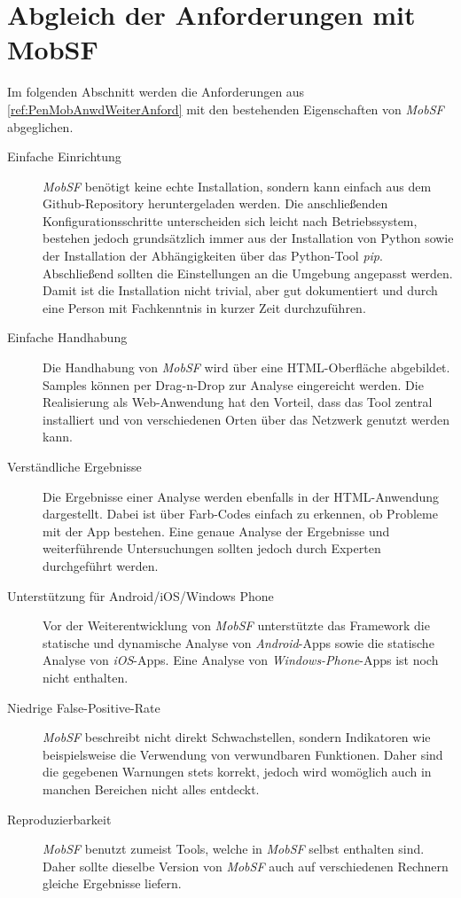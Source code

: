 

\newpage
\section{Abgleich der Anforderungen mit MobSF}\label{ref:PenMobAnwAbgAndMobSF}

Im folgenden Abschnitt werden die Anforderungen aus \ref{ref:PenMobAnwdWeiterAnford} mit den bestehenden Eigenschaften von \textit{MobSF} abgeglichen.

\begin{description}
	\item[Einfache Einrichtung] \textit{MobSF} benötigt keine echte Installation, sondern kann einfach aus dem Github-Repository heruntergeladen werden. Die anschließenden Konfigurationsschritte unterscheiden sich leicht nach Betriebssystem, bestehen jedoch grundsätzlich immer aus der Installation von Python sowie der Installation der Abhängigkeiten über das Python-Tool \textit{pip}. Abschließend sollten die Einstellungen an die Umgebung angepasst werden. Damit ist die Installation nicht trivial, aber gut dokumentiert und durch eine Person mit Fachkenntnis in kurzer Zeit durchzuführen.
	
	\item[Einfache Handhabung] Die Handhabung von \textit{MobSF} wird über eine HTML-Oberfläche abgebildet. Samples können per Drag-n-Drop zur Analyse eingereicht werden. Die Realisierung als Web-Anwendung hat den Vorteil, dass das Tool zentral installiert und von verschiedenen Orten über das Netzwerk genutzt werden kann.
	
	\item[Verständliche Ergebnisse] Die Ergebnisse einer Analyse werden ebenfalls in der HTML-Anwendung dargestellt. Dabei ist über Farb-Codes einfach zu erkennen, ob Probleme mit der App bestehen. Eine genaue Analyse der Ergebnisse und weiterführende Untersuchungen sollten jedoch durch Experten durchgeführt werden.
	
	\item[Unterstützung für Android/iOS/Windows Phone] Vor der Weiterentwicklung von \textit{MobSF} unterstützte das Framework die statische und dynamische Analyse von \textit{Android}-Apps sowie die statische Analyse von \textit{iOS}-Apps. Eine Analyse von \textit{Windows-Phone}-Apps ist noch nicht enthalten.
	
	\item[Niedrige False-Positive-Rate] \textit{MobSF} beschreibt nicht direkt Schwachstellen, sondern Indikatoren wie beispielsweise die Verwendung von verwundbaren Funktionen. Daher sind die gegebenen Warnungen stets korrekt, jedoch wird womöglich auch in manchen Bereichen nicht alles entdeckt.
	
	\item[Reproduzierbarkeit] \textit{MobSF} benutzt zumeist Tools, welche in \textit{MobSF} selbst enthalten sind. Daher sollte dieselbe Version von \textit{MobSF} auch auf verschiedenen Rechnern gleiche Ergebnisse liefern.
	
\end{description}

